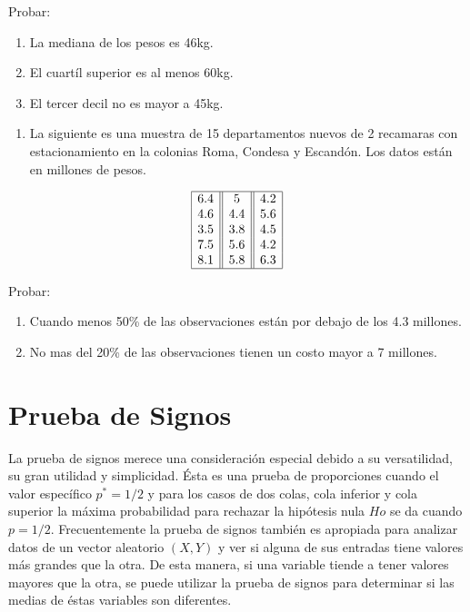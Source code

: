 \documentclass[a4paper,oneside,openany]{book}
\providecommand{\tightlist}{%
  \setlength{\itemsep}{0pt}\setlength{\parskip}{0pt}}
\begin{document}
Probar:

\begin{enumerate}
\def\labelenumi{\alph{enumi})}
\item
  La mediana de los pesos es 46kg.
\item
  El cuartíl superior es al menos 60kg.
\item
  El tercer decil no es mayor a 45kg.
\end{enumerate}

\begin{enumerate}
\def\labelenumi{\arabic{enumi}.}
\setcounter{enumi}{1}
\tightlist
\item
  La siguiente es una muestra de 15 departamentos nuevos de 2 recamaras
  con estacionamiento en la colonias Roma, Condesa y Escandón. Los datos
  están en millones de pesos.
\end{enumerate}

\[
\begin{equation*}
\begin{array}{|c| |c| |c|} 
\hline
6.4&    5&  4.2\\
4.6&    4.4&    5.6\\
3.5&    3.8&    4.5\\
7.5&    5.6&    4.2\\
8.1&    5.8&    6.3\\
\hline
\end{array}
\end{equation*}
\]

Probar:

\begin{enumerate}
\def\labelenumi{\alph{enumi})}
\item
  Cuando menos 50\% de las observaciones están por debajo de los 4.3
  millones.
\item
  No mas del 20\% de las observaciones tienen un costo mayor a 7
  millones.
\end{enumerate}

\chapter{Prueba de Signos}\label{prueba-de-signos}

La prueba de signos merece una consideración especial debido a su
versatilidad, su gran utilidad y simplicidad. Ésta es una prueba de
proporciones cuando el valor específico \(p^*=1/2\) y para los casos de
dos colas, cola inferior y cola superior la máxima probabilidad para
rechazar la hipótesis nula \(Ho\) se da cuando \(p = 1/2\).
Frecuentemente la prueba de signos también es apropiada para analizar
datos de un vector aleatorio \((X,Y)\) y ver si alguna de sus entradas
tiene valores más grandes que la otra. De esta manera, si una variable
tiende a tener valores mayores que la otra, se puede utilizar la prueba
de signos para determinar si las medias de éstas variables son
diferentes.
\end{document}
